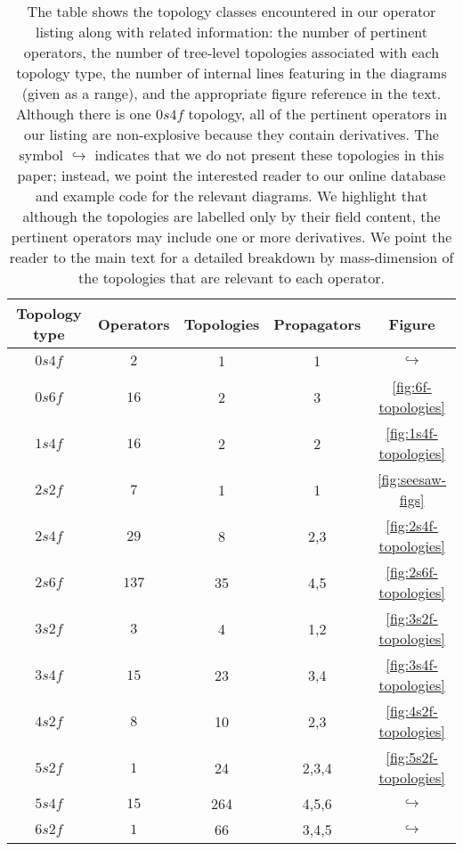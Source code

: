 \begin{table}[t]
  \centering
  \begin{tabular}{ccccc}
    \toprule
    Topology type & Operators & Topologies & Propagators & Figure \\
    \midrule
    $0s4f$        & $2$       & 1          & 1           & $\hookrightarrow$         \\
    $0s6f$        & $16$      & 2          & 3           & \ref{fig:6f-topologies}   \\
    $1s4f$        & $16$      & 2          & 2           & \ref{fig:1s4f-topologies} \\
    $2s2f$        & $7$       & 1          & 1           & \ref{fig:seesaw-figs}     \\
    $2s4f$        & $29$      & 8          & 2,3         & \ref{fig:2s4f-topologies} \\
    $2s6f$        & $137$     & 35         & 4,5         & \ref{fig:2s6f-topologies} \\
    $3s2f$        & $3$       & 4          & 1,2         & \ref{fig:3s2f-topologies} \\
    $3s4f$        & $15$      & 23         & 3,4         & \ref{fig:3s4f-topologies} \\
    $4s2f$        & $8$       & 10         & 2,3         & \ref{fig:4s2f-topologies} \\
    $5s2f$        & $1$       & 24         & 2,3,4       & \ref{fig:5s2f-topologies} \\
    $5s4f$        & $15$      & 264        & 4,5,6       & $\hookrightarrow$         \\
    $6s2f$        & $1$       & 66         & 3,4,5       & $\hookrightarrow$         \\
    \bottomrule
  \end{tabular}
  \caption[The table shows the topology classes encountered in our operator
    listing along with related information: the number of pertinent operators,
    the number of tree-level topologies associated with each topology type, the
    number of internal lines featuring in the diagrams (given as a range), and
    the appropriate figure reference in the text.]{The table shows the topology classes encountered in our operator
    listing along with related information: the number of pertinent operators,
    the number of tree-level topologies associated with each topology type, the
    number of internal lines featuring in the diagrams (given as a range), and
    the appropriate figure reference in the text. Although there is one $0s4f$
    topology, all of the pertinent operators in our listing are non-explosive
    because they contain derivatives. The symbol $\hookrightarrow$ indicates
    that we do not present these topologies in this paper; instead, we point the
    interested reader to our online database and example code for the relevant
    diagrams. We highlight that although the topologies are labelled only by
    their field content, the pertinent operators may include one or more
    derivatives. We point the reader to the main text for a detailed breakdown
    by mass-dimension of the topologies that are relevant to each operator.}
  \label{tab:topology-data}
\end{table}

